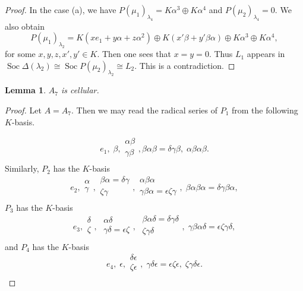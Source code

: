 \documentclass[12pt]{amsart}
\newtheorem{lem}[thm]{Lemma}
\numberwithin{equation}{thm}
\newcommand\Soc{\operatorname{Soc}}
\begin{document}
{\begin{proof}
In the case (a), we have $P(\mu_1)_{\lambda_4}=K\alpha^3\oplus K\alpha^4$
 and $P(\mu_2)_{\lambda_4}=0$. We also obtain
\[P(\mu_1)_{\lambda_2}=K(xe_1+y\alpha+z\alpha^2)\oplus K(x'\beta+y'\beta\alpha)\oplus K\alpha^3\oplus K\alpha^4,\]
for some $x,y,z,x',y'\in K$. Then one sees that $x=y=0$. Thus 
 $L_1$ appears in $\Soc \Delta(\lambda_2)\cong \Soc P(\mu_2)_{\lambda_2}\cong L_2.$
This is a contradiction.
\end{proof}

\begin{lem}
\label{P A7}
$A_7$ is cellular.
\end{lem}
\begin{proof}
Let $A=A_7$. Then we may read the radical series of $P_1$ from the following $K$-basis.

\[
e_1,\; \beta,
\begin{array}{c}
\alpha\beta\\
\gamma\beta\\
\end{array},
\beta\alpha\beta=\delta\gamma\beta,\; \alpha \beta\alpha\beta.
\]
Similarly, $P_2$ has the $K$-basis
\[e_2,
\begin{array}{c}
\alpha\\
\gamma\\
\end{array}
,
\begin{array}{c}
\beta\alpha=\delta\gamma\\
\zeta\gamma\\
\end{array},
\begin{array}{c}
\alpha\beta\alpha\\
\gamma\beta\alpha=\epsilon\zeta\gamma\\
\end{array},\;
\beta\alpha\beta\alpha=\delta\gamma\beta\alpha, \] 
$P_3$ has the $K$-basis
\[e_3,
\begin{array}{c}
\delta\\
\zeta\\
\end{array},\;
\begin{array}{c}
\alpha\delta\\
\gamma\delta=\epsilon\zeta\\
\end{array},\;
\begin{array}{c}
\beta\alpha\delta=\delta\gamma\delta\\
\zeta\gamma\delta\\
\end{array},\;
\gamma\beta\alpha\delta=\epsilon\zeta\gamma\delta,
\]
and $P_4$ has the $K$-basis
\[
e_4,\; \epsilon,
\begin{array}{c}
\delta\epsilon\\
\zeta\epsilon\\
\end{array},\;
\gamma\delta\epsilon=\epsilon\zeta\epsilon, \;
\zeta \gamma\delta\epsilon.
\] 


\end{proof}}
\end{document}
